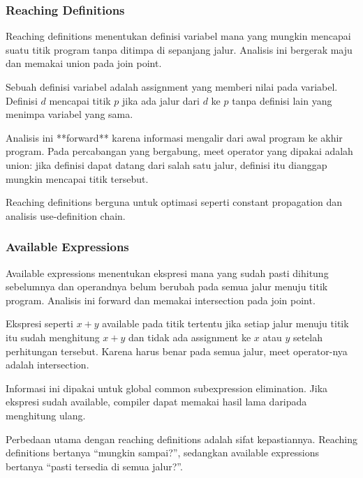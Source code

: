 \subsubsection{Reaching Definitions}

\begin{jawab}
Reaching definitions menentukan definisi variabel mana yang mungkin mencapai suatu titik program tanpa ditimpa di sepanjang jalur. Analisis ini bergerak maju dan memakai union pada join point.
\end{jawab}

Sebuah definisi variabel adalah assignment yang memberi nilai pada variabel. Definisi $d$ mencapai titik $p$ jika ada jalur dari $d$ ke $p$ tanpa definisi lain yang menimpa variabel yang sama.

Analisis ini **forward** karena informasi mengalir dari awal program ke akhir program. Pada percabangan yang bergabung, meet operator yang dipakai adalah union: jika definisi dapat datang dari salah satu jalur, definisi itu dianggap mungkin mencapai titik tersebut.

Reaching definitions berguna untuk optimasi seperti constant propagation dan analisis use-definition chain.

\subsubsection{Available Expressions}

\begin{jawab}
Available expressions menentukan ekspresi mana yang sudah pasti dihitung sebelumnya dan operandnya belum berubah pada semua jalur menuju titik program. Analisis ini forward dan memakai intersection pada join point.
\end{jawab}

Ekspresi seperti $x+y$ available pada titik tertentu jika setiap jalur menuju titik itu sudah menghitung $x+y$ dan tidak ada assignment ke $x$ atau $y$ setelah perhitungan tersebut. Karena harus benar pada semua jalur, meet operator-nya adalah intersection.

Informasi ini dipakai untuk global common subexpression elimination. Jika ekspresi sudah available, compiler dapat memakai hasil lama daripada menghitung ulang.

Perbedaan utama dengan reaching definitions adalah sifat kepastiannya. Reaching definitions bertanya ``mungkin sampai?'', sedangkan available expressions bertanya ``pasti tersedia di semua jalur?''.

